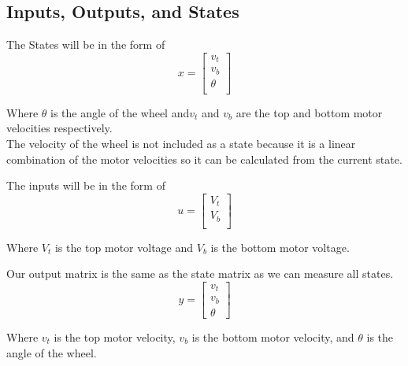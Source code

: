 \documentclass{scrartcl}
\begin{document}
\subsection{Inputs, Outputs, and States}
The States will be in the form of
\begin{equation}
    x =
    \begin{bmatrix}
        v_t    \\
        v_b    \\
        \theta \\
    \end{bmatrix}
\end{equation}

Where \(\theta\) is the angle of the wheel and\(v_t\) and \(v_b\) are the top and bottom motor velocities respectively. \\
The velocity of the wheel is not included as a state because it is a linear combination of the motor velocities so it can be calculated from the current state.

The inputs will be in the form of
\begin{equation}
    u =
    \begin{bmatrix}
        V_t \\
        V_b \\
    \end{bmatrix}
\end{equation}

Where \(V_t\) is the top motor voltage and \(V_b\) is the bottom motor voltage.

Our output matrix is the same as the state matrix as we can measure all states.
\begin{equation}
    y =
    \begin{bmatrix}
        v_t \\
        v_b \\
        \theta
    \end{bmatrix}
\end{equation}

Where \(v_t\) is the top motor velocity, \(v_b\) is the bottom motor velocity, and \(\theta\) is the angle of the wheel.
\end{document}
